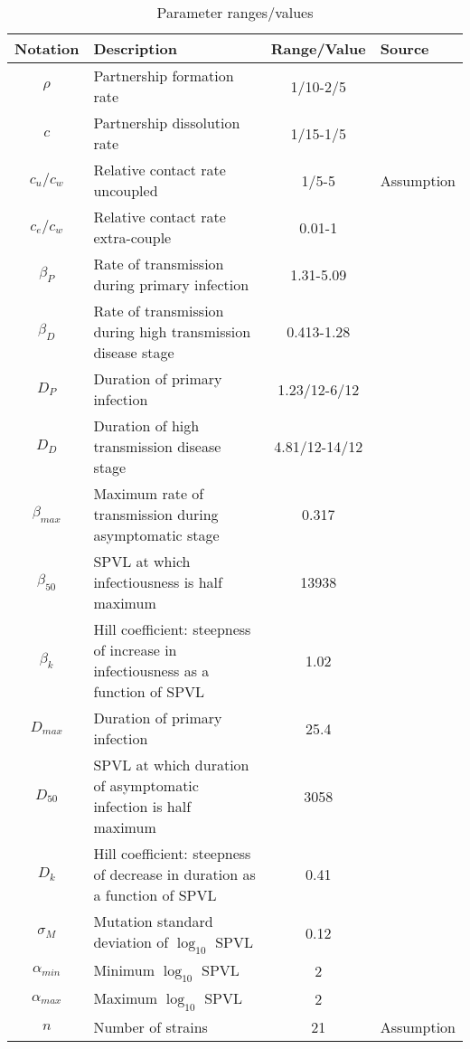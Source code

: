 
\begin{table}[ht]
\caption{Parameter ranges/values}
\centering
\begin{tabular}{c p{2in} c l}
\hline 
Notation & Description & Range/Value & Source\\
\hline %
$\rho$ & Partnership formation rate & 1/10-2/5 & \cite{champredon_hiv_2013} \\
$c$ & Partnership dissolution rate & 1/15-1/5 & \cite{champredon_hiv_2013} \\
$c_u/c_w$ & Relative contact rate uncoupled & 1/5-5 & Assumption \\
$c_e/c_w$ & Relative contact rate extra-couple & 0.01-1 & \cite{champredon_hiv_2013} \\
$\beta_P$ & Rate of transmission during primary infection & 1.31-5.09 & \cite{hollingsworth_hiv1_2008} \\
$\beta_D$ & Rate of transmission during high transmission disease stage & 0.413-1.28 & \cite{hollingsworth_hiv1_2008} \\
$D_P$ & Duration of primary infection & 1.23/12-6/12 & \cite{hollingsworth_hiv1_2008} \\
$D_D$ & Duration of high transmission disease stage & 4.81/12-14/12 & \cite{hollingsworth_hiv1_2008} \\
$\beta_{max}$ & Maximum rate of transmission during asymptomatic stage & 0.317 & \cite{shirreff_transmission_2011} \\
$\beta_{50}$ & SPVL at which infectiousness is half maximum & 13938 & \cite{shirreff_transmission_2011} \\
$\beta_k$ & Hill coefficient: steepness of increase in infectiousness as a function of SPVL & 1.02 & \cite{shirreff_transmission_2011} \\
$D_{max}$ & Duration of primary infection & 25.4 & \cite{shirreff_transmission_2011} \\
$D_{50}$ & SPVL at which duration of asymptomatic infection is half maximum & 3058 & \cite{shirreff_transmission_2011} \\
$D_{k}$ & Hill coefficient: steepness of decrease in duration as a function of SPVL & 0.41 & \cite{shirreff_transmission_2011} \\
$\sigma_M$ & Mutation standard deviation of $\log_{10}$ SPVL & 0.12 & \cite{shirreff_transmission_2011} \\
$\alpha_{min}$ & Minimum $\log_{10}$ SPVL & 2 & \cite{shirreff_transmission_2011}\\
$\alpha_{max}$ & Maximum $\log_{10}$ SPVL & 2 & \cite{shirreff_transmission_2011}\\
$n$ & Number of strains & 21 & Assumption\\
\hline
\end{tabular}
\label{table:parmsTable}
\end{table}



